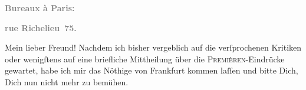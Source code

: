 \pstart
           \begin{otherlanguage}{french}\textcolor{gray}{\textbf{\textbf{Bureaux à Paris:}}}\end{otherlanguage}\pend
           
\pstart
           \begin{otherlanguage}{french}\textcolor{gray}{\textbf{\textbf{rue Richelieu 75.}}}\end{otherlanguage}\pend
           
\pstart\center{}Mein lieber Freund!\pend\vspace{0.5em}
\pstart
           Nachdem ich bisher vergeblich auf die verſprochenen Kritiken oder wenigſtens auf eine
               briefliche Mittheilung über die \textsc{Premièren}-Eindrücke
               gewartet, habe ich mir das Nöthige von Frankfurt
               kommen laſſen und bitte Dich, Dich nun nicht mehr zu bemühen.\pend
           
